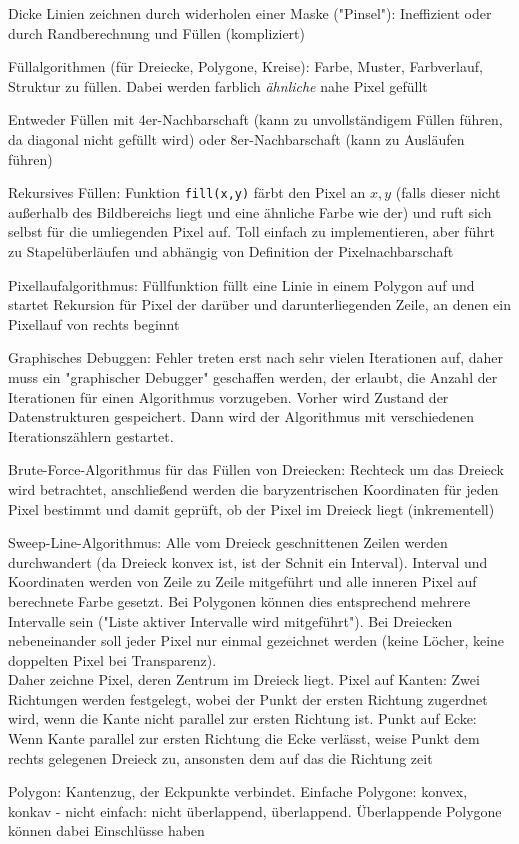 \documentclass[12pt,landscape]{article}
\begin{document}
\begin{multicols}{3}
\begin{compactitem}
\item Dicke Linien zeichnen durch widerholen einer Maske ("Pinsel"): Ineffizient oder durch Randberechnung und Füllen (kompliziert)
\item Füllalgorithmen (für Dreiecke, Polygone, Kreise): Farbe, Muster, Farbverlauf, Struktur zu füllen. Dabei werden farblich \textit{ähnliche} nahe Pixel gefüllt
\item Entweder Füllen mit 4er-Nachbarschaft (kann zu unvollständigem Füllen führen, da diagonal nicht gefüllt wird) oder 8er-Nachbarschaft (kann zu Ausläufen führen)
\item Rekursives Füllen: Funktion \lstinline|fill(x,y)| färbt den Pixel an $x, y$ (falls dieser nicht außerhalb des Bildbereichs liegt und eine ähnliche Farbe wie der) und ruft sich selbst für die umliegenden Pixel auf. Toll einfach zu implementieren, aber führt zu Stapelüberläufen und abhängig von Definition der Pixelnachbarschaft
\item Pixellaufalgorithmus: Füllfunktion füllt eine Linie in einem Polygon auf und startet Rekursion für Pixel der darüber und darunterliegenden Zeile, an denen ein Pixellauf von rechts beginnt
\item Graphisches Debuggen: Fehler treten erst nach sehr vielen Iterationen auf, daher muss ein "graphischer Debugger" geschaffen werden, der erlaubt, die Anzahl der Iterationen für einen Algorithmus vorzugeben. Vorher wird Zustand der Datenstrukturen gespeichert. Dann wird der Algorithmus mit verschiedenen Iterationszählern gestartet.
\item Brute-Force-Algorithmus für das Füllen von Dreiecken: Rechteck um das Dreieck wird betrachtet, anschließend werden die baryzentrischen Koordinaten für jeden Pixel bestimmt und damit geprüft, ob der Pixel im Dreieck liegt (inkrementell)
\item Sweep-Line-Algorithmus: Alle vom Dreieck geschnittenen Zeilen werden durchwandert (da Dreieck konvex ist, ist der Schnit ein Interval). Interval und Koordinaten werden von Zeile zu Zeile mitgeführt und alle inneren Pixel auf berechnete Farbe gesetzt. Bei Polygonen können dies entsprechend mehrere Intervalle sein ("Liste aktiver Intervalle wird mitgeführt"). Bei Dreiecken nebeneinander soll jeder Pixel nur einmal gezeichnet werden (keine Löcher, keine doppelten Pixel bei Transparenz).\\ Daher zeichne Pixel, deren Zentrum im Dreieck liegt. Pixel auf Kanten: Zwei Richtungen werden festgelegt, wobei der Punkt der ersten Richtung zugerdnet wird, wenn die Kante nicht parallel zur ersten Richtung ist. Punkt auf Ecke: Wenn Kante parallel zur ersten Richtung die Ecke verlässt, weise Punkt dem rechts gelegenen Dreieck zu, ansonsten dem auf das die Richtung zeit
\item Polygon: Kantenzug, der Eckpunkte verbindet. Einfache Polygone: konvex, konkav - nicht einfach: nicht überlappend, überlappend. Überlappende Polygone können dabei Einschlüsse haben
\end{compactitem}

\end{multicols}
\end{document}
